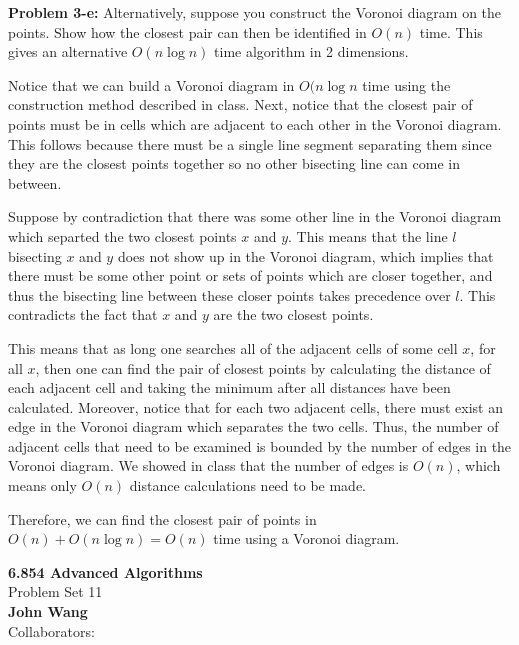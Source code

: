 \documentclass[psamsfonts]{amsart}
\newenvironment{sol}{\vspace{0.25cm}{\large \bfseries Solution:}}{\qedsymbol}
\newenvironment{prob}[1]{\begin{framed}{\large \bfseries Problem #1:}}{\end{framed}}
\newcommand{\makenewtitle}{
    \begin{center}
    {\huge \bfseries 6.854 Advanced Algorithms} \\
    Problem Set 11\\
    \vspace{0.25cm}
    {\bfseries John Wang} \\
    Collaborators:  
    \end{center}
    \vspace{0.5cm}
}
\begin{document}
\begin{prob}{3-e}
Alternatively, suppose you construct the Voronoi diagram on the points. Show how the closest pair can then be identified in $O(n)$ time. This gives an alternative $O(n \log n)$ time algorithm in 2 dimensions.
\end{prob}
\begin{sol}
Notice that we can build a Voronoi diagram in $O(n \log n$ time using the construction method described in class. Next, notice that the closest pair of points must be in cells which are adjacent to each other in the Voronoi diagram. This follows because there must be a single line segment separating them since they are the closest points together so no other bisecting line can come in between. 

Suppose by contradiction that there was some other line in the Voronoi diagram which separted the two closest points $x$ and $y$. This means that the line $l$ bisecting $x$ and $y$ does not show up in the Voronoi diagram, which implies that there must be some other point or sets of points which are closer together, and thus the bisecting line between these closer points takes precedence over $l$. This contradicts the fact that $x$ and $y$ are the two closest points.

This means that as long one searches all of the adjacent cells of some cell $x$, for all $x$, then one can find the pair of closest points by calculating the distance of each adjacent cell and taking the minimum after all distances have been calculated. Moreover, notice that for each two adjacent cells, there must exist an edge in the Voronoi diagram which separates the two cells. Thus, the number of adjacent cells that need to be examined is bounded by the number of edges in the Voronoi diagram. We showed in class that the number of edges is $O(n)$, which means only $O(n)$ distance calculations need to be made.

Therefore, we can find the closest pair of points in $O(n) + O(n \log n) = O(n)$ time using a Voronoi diagram.
\end{sol}

\newpage
\makenewtitle
\end{document}
